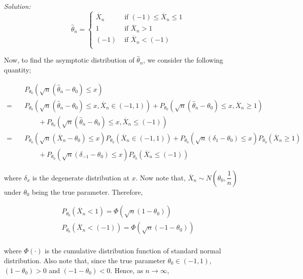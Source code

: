 \documentclass[12pt]{article}
\theoremstyle{definition}
\newenvironment{answer}{\textit{Solution: }\quad }{ \hfill \qedsymbol}
\begin{document}
\begin{answer}
	$$
	\widehat{\theta}_n = \begin{cases}
		\overline{X}_n & \text{ if } (-1) \leq \overline{X}_n \leq 1\\
		1 & \text{ if } \overline{X}_n > 1\\
		(-1) & \text{ if } \overline{X}_n < (-1)\\
	\end{cases}
	$$

	Now, to find the asymptotic distribution of $\widehat{\theta}_n$, we consider the following quantity;

	\begin{align*}
		& P_{\theta_0} \left( \sqrt{n}(\widehat{\theta}_n - \theta_0) \leq x \right)\\
		= \quad & P_{\theta_0} \left( \sqrt{n}(\widehat{\theta}_n - \theta_0) \leq x, \overline{X}_n \in (-1, 1) \right) + P_{\theta_0} \left( \sqrt{n}(\widehat{\theta}_n - \theta_0) \leq x , \overline{X}_n \geq 1\right) \\
		& \qquad + P_{\theta_0} \left( \sqrt{n}(\widehat{\theta}_n - \theta_0) \leq x, \overline{X}_n \leq (-1) \right)\\
		= \quad & P_{\theta_0} \left( \sqrt{n}(\overline{X}_n - \theta_0) \leq x \right)P_{\theta_0} \left( \overline{X}_n \in (-1, 1) \right) + P_{\theta_0} \left( \sqrt{n}(\delta_{1} - \theta_0) \leq x \right)P_{\theta_0} \left( \overline{X}_n \geq 1 \right) \\
		& \qquad + P_{\theta_0} \left( \sqrt{n}(\delta_{-1} - \theta_0) \leq x \right)P_{\theta_0} \left( \overline{X}_n \leq (-1) \right)
	\end{align*}

	where $\delta_x$ is the degenerate distribution at $x$. Now note that, $\overline{X}_n \sim N(\theta_0, \dfrac{1}{n})$ under $\theta_0$ being the true parameter. Therefore,

	$$
	\begin{array}{l}
		P_{\theta_0}\left( \overline{X}_n < 1 \right) = \Phi\left( \sqrt{n}(1-\theta_0) \right)\\
		P_{\theta_0}\left( \overline{X}_n < (-1) \right) = \Phi\left( \sqrt{n}(-1-\theta_0) \right)\\
	\end{array}
	$$

	where $\Phi(\cdot)$ is the cumulative distribution function of standard normal distribution. Also note that, since the true parameter $\theta_0 \in (-1, 1)$, $(1 - \theta_0) > 0$ and $(-1 - \theta_0) < 0$. Hence, as $n \rightarrow \infty$,


\end{answer}
\end{document}

